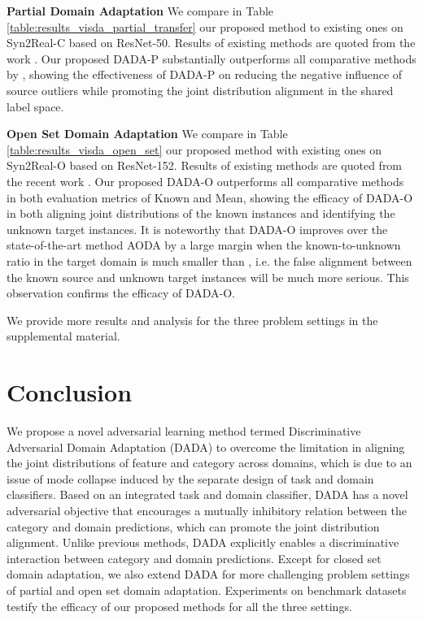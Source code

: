 \documentclass[letterpaper]{article} \usepackage{aaai20}  \usepackage{times}  \usepackage{helvet} \usepackage{courier}  \usepackage[hyphens]{url}  \usepackage{graphicx} \urlstyle{rm} \def\UrlFont{\rm}  \usepackage{graphicx}  \frenchspacing  \setlength{\pdfpagewidth}{8.5in}  \setlength{\pdfpageheight}{11in}
\begin{document}
\noindent\textbf{Partial Domain Adaptation} We compare in Table \ref{table:results_visda_partial_transfer} our proposed method to existing ones on Syn2Real-C based on ResNet-50. Results of existing methods are quoted from the work \cite{pada}. Our proposed DADA-P substantially outperforms all comparative methods by , showing the effectiveness of DADA-P on reducing the negative influence of source outliers while promoting the joint distribution alignment in the shared label space. 

\noindent\textbf{Open Set Domain Adaptation} We compare in Table \ref{table:results_visda_open_set} our proposed method with existing ones on Syn2Real-O based on ResNet-152. Results of existing methods are quoted from the recent work \cite{visda}. Our proposed DADA-O outperforms all comparative methods in both evaluation metrics of Known and Mean, showing the efficacy of DADA-O in both aligning joint distributions of the known instances and identifying the unknown target instances. It is noteworthy that DADA-O improves over the state-of-the-art method AODA by a large margin when the known-to-unknown ratio in the target domain is much smaller than , i.e. the false alignment between the known source and unknown target instances will be much more serious. This observation confirms the efficacy of DADA-O.

We provide more results and analysis for the three problem settings in the supplemental material.

\section{Conclusion}
We propose a novel adversarial learning method termed Discriminative Adversarial Domain Adaptation (DADA) to overcome the limitation in aligning the joint distributions of feature and category across domains, which is due to an issue of mode collapse induced by the separate design of task and domain classifiers. Based on an integrated task and domain classifier, DADA has a novel adversarial objective that encourages a mutually inhibitory relation between the category and domain predictions, which can promote the joint distribution alignment. Unlike previous methods, DADA explicitly enables a discriminative interaction between category and domain predictions. Except for closed set domain adaptation, we also extend DADA for more challenging problem settings of partial and open set domain adaptation. Experiments on benchmark datasets testify the efficacy of our proposed methods for all the three settings.
\end{document}
